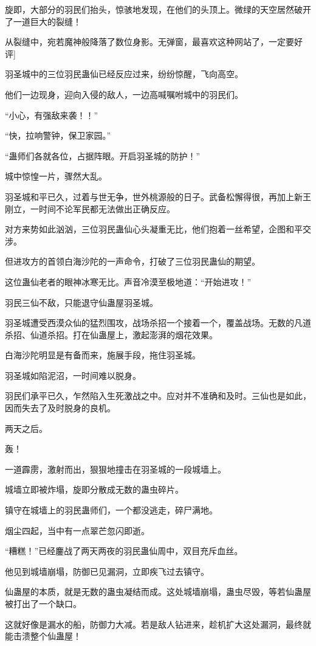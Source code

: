 \begin{this_body}
旋即，大部分的羽民们抬头，惊骇地发现，在他们的头顶上。微绿的天空居然破开了一道巨大的裂缝！

从裂缝中，宛若魔神般降落了数位身影。无弹窗，最喜欢这种网站了，一定要好评]

羽圣城中的三位羽民蛊仙已经反应过来，纷纷惊醒，飞向高空。

他们一边现身，迎向入侵的敌人，一边高喊嘱咐城中的羽民们。

“小心，有强敌来袭！！”

“快，拉响警钟，保卫家园。”

“蛊师们各就各位，占据阵眼。开启羽圣城的防护！”

城中惊惶一片，骤然大乱。

羽圣城和平已久，过着与世无争，世外桃源般的日子。武备松懈得很，再加上新王刚立，一时间不论军民都无法做出正确反应。

对方来势如此汹汹，三位羽民蛊仙心头凝重无比，他们抱着一丝希望，企图和平交涉。

但进攻方的首领白海沙陀的一声命令，打破了三位羽民蛊仙的期望。

这位蛊仙老者的眼神冰寒无比。声音冷漠至极地道：“开始进攻！”

羽民三仙不敌，只能退守仙蛊屋羽圣城。

羽圣城遭受西漠众仙的猛烈围攻，战场杀招一个接着一个，覆盖战场。无数的凡道杀招、仙道杀招。打在仙蛊屋上，激起澎湃的烟花效果。

白海沙陀明显是有备而来，施展手段，拖住羽圣城。

羽圣城如陷泥沼，一时间难以脱身。

羽民们承平已久，乍然陷入生死激战之中。应对并不准确和及时。三仙也是如此，因而失去了及时脱身的良机。

两天之后。

轰！

一道霹雳，激射而出，狠狠地撞击在羽圣城的一段城墙上。

城墙立即被炸塌，旋即分散成无数的蛊虫碎片。

镇守在城墙上的羽民蛊师们，一个都没逃走，碎尸满地。

烟尘四起，当中有一点翠芒忽闪即逝。

“糟糕！”已经鏖战了两天两夜的羽民蛊仙周中，双目充斥血丝。

他见到城墙崩塌，防御已见漏洞，立即疾飞过去镇守。

仙蛊屋的本质，就是无数的蛊虫凝结而成。这处城墙崩塌，蛊虫尽毁，等若仙蛊屋被打出了一个缺口。

这就好像是漏水的船，防御力大减。若是敌人钻进来，趁机扩大这处漏洞，最终就能击溃整个仙蛊屋！


\end{this_body}
